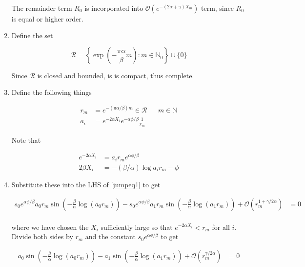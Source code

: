\documentclass[12pt]{article}
\def\N{{\mathbb N}}
\begin{document}
\begin{enumerate}
The remainder term $R_0$ is incorporated into $\mathcal{O}(e^{-(2 \alpha + \gamma) X_m})$ term, since $R_0$ is equal or higher order.

\item Define the set

\begin{equation}\label{setR}
\mathcal{R} = \left\{ \exp\left(-\frac{\pi \alpha}{\beta}m\right) : m \in \N_0 \right\} \cup \{ 0 \}
\end{equation}

Since $\mathcal{R}$ is closed and bounded, is is compact, thus complete.

\item Define the following things

\begin{align*}
r_m &= e^{-(\pi \alpha /\beta) m} \in \mathcal{R} && m \in \N \\
a_i &= e^{-2\alpha X_i}e^{-\alpha \phi / \beta}\frac{1}{r_m}
\end{align*}

Note that

\begin{align*}
e^{-2 \alpha X_i} &= a_i r_m e^{\alpha \phi / \beta} \\
2 \beta X_i &= -(\beta / \alpha)\log a_i r_m - \phi 
\end{align*}

\item Substitute these into the LHS of \eqref{jumpeq1} to get 

\begin{align}\label{jumpeq2}
s_0 e^{\alpha \phi / \beta } a_0 r_m \sin \left( - \frac{\beta}{\alpha} \log (a_0 r_m) \right) - s_0 e^{\alpha \phi / \beta } a_1 r_m \sin \left( - \frac{\beta}{\alpha} \log (a_1 r_m) \right) + \mathcal{O}(r_m^{1 + \gamma / 2 \alpha}) &= 0 \\
\end{align}

where we have chosen the $X_i$ sufficiently large so that $e^{-2 \alpha X_i} < r_m$ for all $i$. Divide both sides by $r_m$ and the constant $s_0 e^{\alpha \phi / \beta }$ to get

\begin{align}\label{jumpeq3}
a_0 \sin \left( - \frac{\beta}{\alpha} \log (a_0 r_m) \right) - a_1 \sin \left( - \frac{\beta}{\alpha} \log (a_1 r_m) \right) + \mathcal{O}(r_m^{\gamma / 2 \alpha}) &= 0 \\
\end{align}


\end{enumerate}
\end{document}
